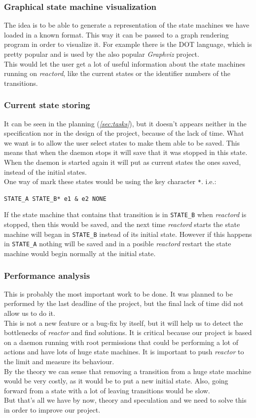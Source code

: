 \subsubsection{Graphical state machine visualization}
The idea is 
to be able to generate a representation of the state machines we have loaded in a known format. This way it can be passed to a graph
rendering program in order to visualize it. For example there is the DOT\cite{graphviz:dot} language, which is pretty popular and is used
by the also popular \emph{Graphviz}\cite{graphviz} project.\\
This would let the user get a lot of useful information about the state machines running on \emph{reactord}, like the current states or
the identifier numbers of the transitions.
\subsubsection{Current state storing}
It can be seen in the planning (\emph{\ref{sec:tasks}}), but it doesn't appears neither in the specification nor in the design of the 
project, because of the lack of time. What we want is to allow the user select states to make them able to be saved. This means that when
the daemon stops it will save that it was stopped in this state. When the daemon is started again it will put as current states the ones 
saved, instead of the initial states.\\
One way of mark these states would be using the key character \texttt{*}. i.e.:
\begin{center}
  \texttt{STATE\_A STATE\_B* e1 \& e2 NONE}
\end{center}
If the state machine that contains that transition is in \texttt{STATE\_B} when \emph{reactord} is stopped, then this would be saved, and
the next time \emph{reactord} starts the state machine will began in \texttt{STATE\_B} instead of its initial state. However if this 
happens in \texttt{STATE\_A} nothing will be saved and in a posible \emph{reactord} restart the state machine would begin normally
at the initial state.
\subsubsection{Performance analysis}
This is probably the most important work to be done. It was planned to be performed by the last deadline of the project, but the final lack
of time did not allow us to do it.\\
This is not a new feature or a bug-fix by itself, but it will help us to detect the bottlenecks of \emph{reactor} and find solutions. It 
is critical because our project is based on a daemon running with root permissions that could be performing a lot of actions and have lots
of huge state machines. It is important to push \emph{reactor} to the limit and measure its behaviour.\\
By the theory we can sense that removing a transition from a huge state machine would be very costly, as it would be to put a new initial
state. Also, going forward from a state with a lot of leaving transitions would be slow.\\
But that's all we have by now, theory and speculation and we need to solve this in order to improve our project.
